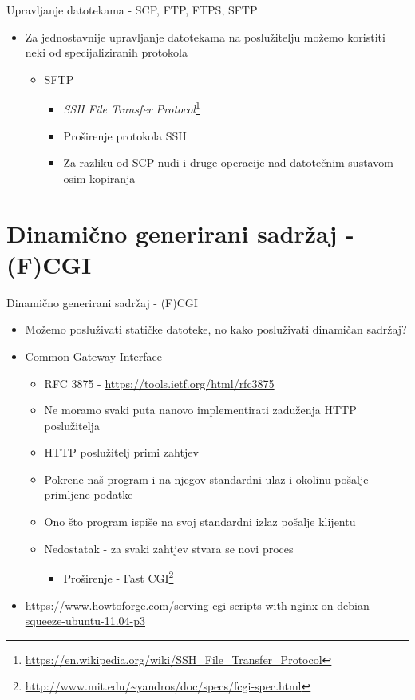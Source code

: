 \documentclass[t]{beamer}
\begin{document}
\begin{frame}{Upravljanje datotekama - SCP, FTP, FTPS, SFTP}
    \begin{itemize}
        \item Za jednostavnije upravljanje datotekama na poslužitelju možemo koristiti neki od specijaliziranih protokola
        \begin{itemize}
            \item SFTP
            \begin{itemize}
                \item \textit{SSH File Transfer Protocol}\footnote{\url{https://en.wikipedia.org/wiki/SSH_File_Transfer_Protocol}}
                \item Proširenje protokola SSH
                \item Za razliku od SCP nudi i druge operacije nad datotečnim sustavom osim kopiranja
            \end{itemize}
        \end{itemize}
    \end{itemize}
\end{frame}


\section{Dinamično generirani sadržaj - (F)CGI}

\begin{frame}{Dinamično generirani sadržaj - (F)CGI}
    \begin{itemize}
        \item Možemo posluživati statičke datoteke, no kako posluživati dinamičan sadržaj?
        \item Common Gateway Interface
        \begin{itemize}
            \item RFC 3875 - \url{https://tools.ietf.org/html/rfc3875}
            \item Ne moramo svaki puta nanovo implementirati zaduženja HTTP poslužitelja
            \item HTTP poslužitelj primi zahtjev
            \item Pokrene naš program i na njegov standardni ulaz i okolinu pošalje primljene podatke
            \item Ono što program ispiše na svoj standardni izlaz pošalje klijentu
            \item Nedostatak - za svaki zahtjev stvara se novi proces
            \begin{itemize}
                \item Proširenje - Fast CGI\footnote{\url{http://www.mit.edu/~yandros/doc/specs/fcgi-spec.html}}
            \end{itemize}
        \end{itemize}
        \item \url{https://www.howtoforge.com/serving-cgi-scripts-with-nginx-on-debian-squeeze-ubuntu-11.04-p3}
    \end{itemize}
\end{frame}
\end{document}
